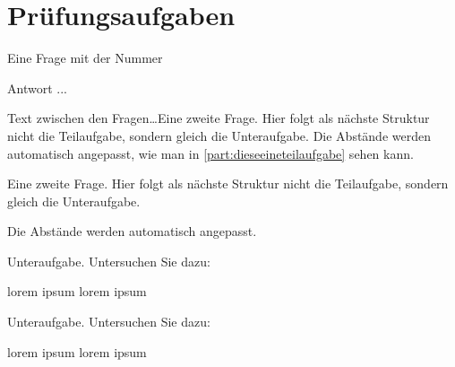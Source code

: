 \documentclass[a4paper,12pt]{article}
\begin{document}
\section{Prüfungsaufgaben}


\question%
	Eine Frage mit der Nummer \thequestion
{}
%
\begin{solution}
	Antwort ...
\end{solution}


Text zwischen den Fragen\ldots Eine zweite Frage. Hier folgt als nächste Struktur nicht die Teilaufgabe, sondern gleich die Unteraufgabe. Die Abstände werden automatisch angepasst, wie man in \ref{part:dieseeineteilaufgabe} sehen kann.


\question%
Eine zweite Frage. Hier folgt als nächste Struktur nicht die Teilaufgabe, sondern gleich die Unteraufgabe. 

Die Abstände werden automatisch angepasst.
\begin{subparts}
		\subpart Unteraufgabe. Untersuchen Sie  dazu:
	\begin{subsubparts}
		\subsubpart lorem ipsum
		\subsubpart lorem ipsum
	\end{subsubparts}
		\subpart Unteraufgabe. Untersuchen Sie  dazu:
	\begin{subsubparts}
		\subsubpart lorem ipsum
		\subsubpart lorem ipsum
	\end{subsubparts}
\end{subparts}
\omitsolution
\end{document}
